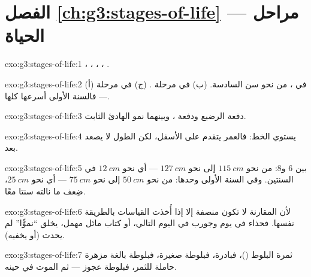 \section*{الفصل \ref{ch:g3:stages-of-life} --- مراحل الحياة}

\begin{solution}{exo:g3:stages-of-life:1}
، ، ، ، .
\end{solution}

\begin{solution}{exo:g3:stages-of-life:2}
(أ) في ، من نحو سن السادسة. (ب) في مرحلة . (ج) في
مرحلة  --- فالسنة الأولى أسرعها كلها.
\end{solution}

\begin{solution}{exo:g3:stages-of-life:3}
دفعة الرضيع ودفعة ، وبينهما نمو  الهادئ الثابت.
\end{solution}

\begin{solution}{exo:g3:stages-of-life:4}
يستوي الخط: فالعمر يتقدم على الأسفل، لكن الطول لا يصعد بعد.
\end{solution}

\begin{solution}{exo:g3:stages-of-life:5}
بين $6$ و$8$: من نحو $\qty{115}{cm}$ إلى نحو $\qty{127}{cm}$ ---
أي نحو $\qty{12}{cm}$ في السنتين. وفي السنة الأولى وحدها: من نحو
$\qty{50}{cm}$ إلى نحو $\qty{75}{cm}$ --- أي نحو $\qty{25}{cm}$،
ضِعف ما نالته سنتا  معًا.
\end{solution}

\begin{solution}{exo:g3:stages-of-life:6}
لأن المقارنة لا تكون منصفة إلا إذا أُخذت القياسات بالطريقة نفسها.
فحذاء في يوم وجورب في اليوم التالي، أو كتاب مائل مهمل، يخلق
``نموًّا'' لم يحدث (أو يخفيه).
\end{solution}

\begin{solution}{exo:g3:stages-of-life:7}
ثمرة البلوط ()، فبادرة، فبلوطة صغيرة، فبلوطة بالغة مزهرة حاملة
للثمر، فبلوطة عجوز --- ثم الموت في حينه.
\end{solution}

